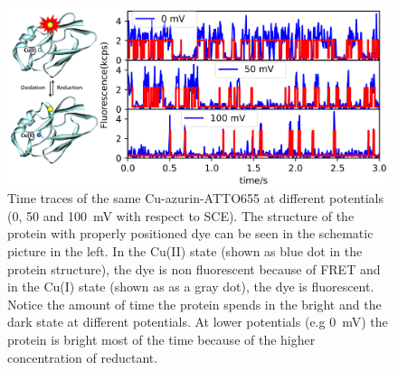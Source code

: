 \documentclass[journal=jacsat,manuscript=article]{achemso}
\begin{document}
\begin{figure}
	\centering
	\includegraphics[]{Figure_1_timetrace_CuAzu}
	\caption{Time traces of the same Cu-azurin-ATTO655 at different potentials (0, 50 and \SI{100}{\mV} with respect to SCE).
	The structure of the protein with properly positioned dye can be seen in the schematic picture in the left.
	In the Cu(II) state (shown as blue dot in the protein structure), the dye is non fluorescent because of FRET and in the Cu(I) state (shown as as a gray dot), the dye is fluorescent. Notice the amount of time the protein spends in the bright and the dark state at different potentials.
	At lower potentials (e.g \SI{0}{\mV}) the protein is bright most of the time because of the higher concentration of reductant.}
	\label{fig:timetrace}
\end{figure}
\end{document}
